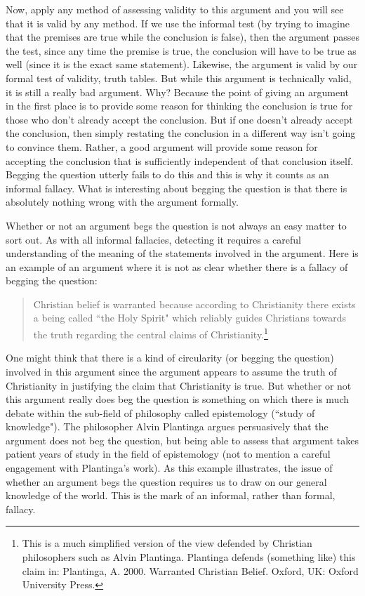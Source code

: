 Now, apply any method of assessing validity to this argument and you will see
that it is valid by any method. If we use the informal test (by trying to imagine
that the premises are true while the conclusion is false), then the argument
passes the test, since any time the premise is true, the conclusion will have to be
true as well (since it is the exact same statement). Likewise, the argument is
valid by our formal test of validity, truth tables. But while this argument is
technically valid, it is still a really bad argument. Why? Because the point of
giving an argument in the first place is to provide some reason for thinking the
conclusion is true for those who don't already accept the conclusion. But if one
doesn't already accept the conclusion, then simply restating the conclusion in a
different way isn't going to convince them. Rather, a good argument will
provide some reason for accepting the conclusion that is sufficiently
independent of that conclusion itself. Begging the question utterly fails to do
this and this is why it counts as an informal fallacy. What is interesting about
begging the question is that there is absolutely nothing wrong with the
argument formally.

Whether or not an argument begs the question is not always an easy matter to
sort out.      As with all informal fallacies, detecting it requires a careful
understanding of the meaning of the statements involved in the argument. Here
is an example of an argument where it is not as clear whether there is a fallacy of
begging the question:

\begin{quote}        Christian belief is warranted because according to Christianity there exists
        a being called ``the Holy Spirit" which reliably guides Christians towards
        the truth regarding the central claims of Christianity.\footnote{This is a much simplified version of the view defended by Christian philosophers such as Alvin
Plantinga. Plantinga defends (something like) this claim in: Plantinga, A. 2000. Warranted
Christian Belief. Oxford, UK: Oxford University Press.}
\end{quote}

One might think that there is a kind of circularity (or begging the question)
involved in this argument since the argument appears to assume the truth of
Christianity in justifying the claim that Christianity is true. But whether or not this
argument really does beg the question is something on which there is much
debate within the sub-field of philosophy called epistemology (``study of
knowledge"). The philosopher Alvin Plantinga argues persuasively that the
argument does not beg the question, but being able to assess that argument
takes patient years of study in the field of epistemology (not to mention a careful
engagement with Plantinga's work). As this example illustrates, the issue of
whether an argument begs the question requires us to draw on our general
knowledge of the world. This is the mark of an informal, rather than formal,
fallacy.


